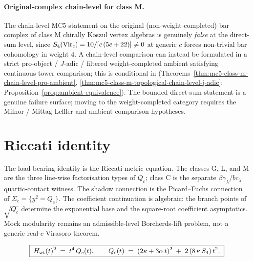 \paragraph{Original-complex chain-level for class M.}
The chain-level MC5 statement on the original (non-weight-completed)
bar complex of class M chirally Koszul vertex algebras is
genuinely \emph{false} at the direct-sum level, since
$S_4(\mathrm{Vir}_c) = 10/[c\,(5 c + 22)] \neq 0$ at generic $c$ forces
non-trivial bar cohomology in weight $4$. A chain-level comparison can
instead be formulated in a strict pro-object / $J$-adic /
filtered weight-completed ambient satisfying continuous tower
comparison; this is conditional in
\textup{(}Theorems~\ref{thm:mc5-class-m-chain-level-pro-ambient},
\ref{thm:mc5-class-m-topological-chain-level-j-adic};
Proposition~\ref{prop:ambient-equivalence}\textup{)}. The bounded
direct-sum statement is a genuine failure surface; moving to the
weight-completed category requires the Milnor / Mittag-Leffler and
ambient-comparison hypotheses.

\section{Riccati identity}
\label{sec:platonic-display}

The load-bearing identity is the Riccati metric equation. The classes
G, L, and M are the three line-wise factorisation types of $Q_c$;
class C is the separate $\beta\gamma_\lambda/bc_\lambda$
quartic-contact witness. The shadow connection is the Picard--Fuchs
connection of $\Sigma_c=\{y^2=Q_c\}$. The coefficient continuation is
algebraic: the branch points of $\sqrt{Q_c}$ determine the
exponential base and the square-root coefficient asymptotics. Mock
modularity remains an admissible-level Borcherds-lift problem, not a
generic real-$c$ Virasoro theorem.

\begin{equation}
\label{eq:platonic-display}
\boxed{\;
H_{\rm wt}(t)^{2} \;=\; t^{4}\,Q_c(t),
\qquad
Q_c(t) \;=\; (2\kappa + 3\alpha\,t)^{2} \;+\; 2\,(8\,\kappa\,S_4)\,t^{2}.
\;}
\end{equation}

